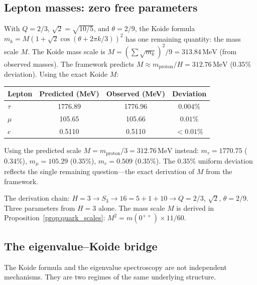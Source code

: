 \documentclass[11pt,a4paper]{article}
\theoremstyle{definition}
\theoremstyle{remark}
\begin{document}
\subsection{Lepton masses: zero free parameters}

With $Q = 2/3$, $\sqrt{2} = \sqrt{10/5}$, and $\theta = 2/9$, the Koide formula $m_k = M(1 + \sqrt{2}\cos(\theta + 2\pi k/3))^2$ has one remaining quantity: the mass scale $M$. The Koide mass scale is $M = (\sum\sqrt{m_k})^2/9 = 313.84\,\mathrm{MeV}$ (from observed masses). The framework predicts $M \approx m_{\mathrm{proton}}/H = 312.76\,\mathrm{MeV}$ ($0.35\%$ deviation). Using the exact Koide $M$:

\begin{center}
\begin{tabular}{lccc}
\toprule
Lepton & Predicted (MeV) & Observed (MeV) & Deviation \\
\midrule
$\tau$ & 1776.89 & 1776.96 & $0.004\%$ \\
$\mu$ & 105.65 & 105.66 & $0.01\%$ \\
$e$ & 0.5110 & 0.5110 & $< 0.01\%$ \\
\bottomrule
\end{tabular}
\end{center}

Using the predicted scale $M = m_{\mathrm{proton}}/3 = 312.76\,\mathrm{MeV}$ instead: $m_\tau = 1770.75$ ($0.34\%$), $m_\mu = 105.29$ ($0.35\%$), $m_e = 0.509$ ($0.35\%$). The $0.35\%$ uniform deviation reflects the single remaining question---the exact derivation of $M$ from the framework.

The derivation chain: $H=3 \to S_3 \to 16 = 5 + 1 + 10 \to Q = 2/3$, $\sqrt{2}$, $\theta = 2/9$. Three parameters from $H = 3$ alone. The mass scale $M$ is derived in Proposition~\ref{prop:quark_scales}: $M^2=m(0^{++})\times 11/60$.


\subsection{The eigenvalue--Koide bridge}\label{sec:koide_bridge}

The Koide formula and the eigenvalue spectroscopy are not independent mechanisms. They are two regimes of the same underlying structure.
\end{document}
